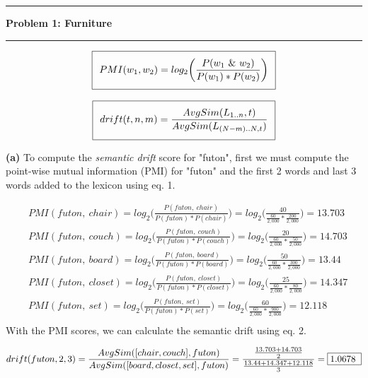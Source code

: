 \documentclass[11pt]{article}
\newcommand\question[2]{\vspace{.25in}\hrule\textbf{#1: #2}\vspace{.5em}\hrule\vspace{.10in}}
\renewcommand\part[1]{\vspace{.10in}\textbf{(#1)}}
\begin{document}
\raggedright

\newcommand\NAME{Jake Pitkin}
\newcommand\UID{u0891770}
\newcommand\HWNUM{2}

\question{Problem 1}{Furniture}

\begin{equation}
\setlength\fboxsep{0.25cm}
\setlength\fboxrule{0.4pt}
\boxed{PMI(w_1, w_2) = log_2\bigg(\frac{P(w_1 \ \& \ w_2)}{P(w_1) * P(w_2)}\bigg)}
\end{equation}

\begin{equation}
\setlength\fboxsep{0.25cm}
\setlength\fboxrule{0.4pt}
\boxed{drift(t, n, m) = \frac{AvgSim(L_{1..n}, t)}{AvgSim(L_{(N-m)..N, t})}}
\end{equation}

\part{a} To compute the \textit{semantic drift} score for "futon", first we must compute the point-wise mutual information (PMI) for "futon" and the first 2 words and last 3 words added to the lexicon using eq. 1.

\begin{align*}
&PMI(futon, \ chair) = log_2\bigg(\frac{P(futon, \ chair)}{P(futon) * P(chair)}\bigg) = log_2\bigg(\frac{40}{\frac{60}{2,000} * \frac{200}{2,000}}\bigg) = 13.703 \\
&PMI(futon, \ couch) = log_2\bigg(\frac{P(futon, \ couch)}{P(futon) * P(couch)}\bigg) = log_2\bigg(\frac{20}{\frac{60}{2,000} * \frac{50}{2,000}}\bigg) =  14.703\\
&PMI(futon, \ board) = log_2\bigg(\frac{P(futon, \ board)}{P(futon) * P(board)}\bigg) = log_2\bigg(\frac{50}{\frac{60}{2,000} * \frac{300}{2,000}}\bigg) =  13.44\\
&PMI(futon, \ closet) = log_2\bigg(\frac{P(futon, \ closet)}{P(futon) * P(closet)}\bigg) = log_2\bigg(\frac{25}{\frac{60}{2,000} * \frac{80}{2,000}}\bigg) =  14.347\\
&PMI(futon, \ set) = log_2\bigg(\frac{P(futon, \ set)}{P(futon) * P(set)}\bigg) = log_2\bigg(\frac{60}{\frac{60}{2,000} * \frac{900}{2,000}}\bigg) =  12.118\\
\end{align*}
With the PMI scores, we can calculate the semantic drift using eq. 2.

\begin{align*}
&drift(futon, 2, 3) = \frac{AvgSim([chair, couch], futon)}{AvgSim([board, closet, set], futon)} = \frac{\frac{13.703 + 14.703}{2}}{\frac{13.44 + 14.347 + 12.118}{3}} = \framebox[1.2\width]{1.0678 }\\
\end{align*}
\end{document}
